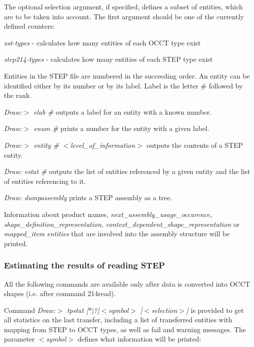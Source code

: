 The optional selection argument, if specified, defines a subset of entities, which are to be taken into account. The first argument should be one of the currently defined counters\+:
\begin{DoxyItemize}
\item {\itshape xst-\/types} -\/ calculates how many entities of each O\+C\+CT type exist
\item {\itshape step214-\/types} -\/ calculates how many entities of each S\+T\+EP type exist
\end{DoxyItemize}

Entities in the S\+T\+EP file are numbered in the succeeding order. An entity can be identified either by its number or by its label. Label is the letter \# followed by the rank.
\begin{DoxyItemize}
\item {\itshape Draw\+:$>$ elab \#} outputs a label for an entity with a known number.
\item {\itshape Draw\+:$>$ enum \#} prints a number for the entity with a given label.
\item {\itshape Draw\+:$>$ entity \# $<$level\+\_\+of\+\_\+information$>$} outputs the contents of a S\+T\+EP entity.
\item {\itshape Draw\+: estat \#} outputs the list of entities referenced by a given entity and the list of entities referencing to it.
\item {\itshape Draw\+: dumpassembly} prints a S\+T\+EP assembly as a tree.
\end{DoxyItemize}

Information about product names, {\itshape next\+\_\+assembly\+\_\+usage\+\_\+occurence, shape\+\_\+definition\+\_\+representation, context\+\_\+dependent\+\_\+shape\+\_\+representation} or {\itshape mapped\+\_\+item entities} that are involved into the assembly structure will be printed.\hypertarget{occt_user_guides__step_occt_step_6_4_2}{}\subsubsection{Estimating the results of reading S\+T\+EP}\label{occt_user_guides__step_occt_step_6_4_2}
All the following commands are available only after data is converted into O\+C\+CT shapes (i.\+e. after command 214read).

Command {\itshape Draw\+:$>$ tpstat \mbox{[}$\ast$$\vert$?\mbox{]}$<$symbol$>$ \mbox{[}$<$selection$>$\mbox{]}} is provided to get all statistics on the last transfer, including a list of transferred entities with mapping from S\+T\+EP to O\+C\+CT types, as well as fail and warning messages. The parameter {\itshape $<$symbol$>$} defines what information will be printed\+:


